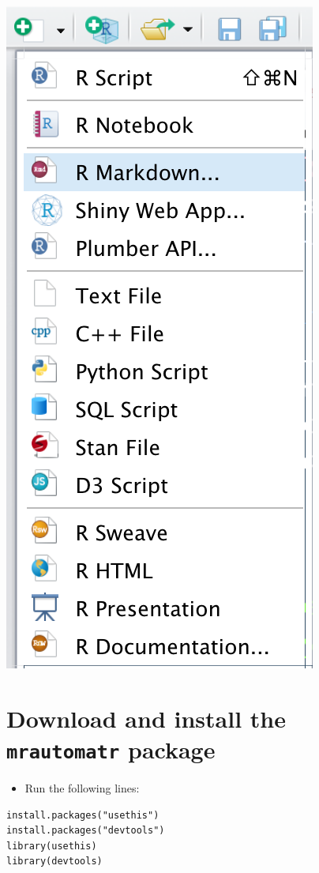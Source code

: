 \documentclass[
]{book}
\providecommand{\tightlist}{%
  \setlength{\itemsep}{0pt}\setlength{\parskip}{0pt}}
\begin{document}
\begin{center}\includegraphics[width=0.66\linewidth]{images/Rstudio_toolbar} \end{center}

\hypertarget{download-and-install-the-mrautomatr-package}{%
\section{\texorpdfstring{Download and install the \texttt{mrautomatr} package}{Download and install the mrautomatr package}}\label{download-and-install-the-mrautomatr-package}}

\begin{itemize}
\tightlist
\item
  Run the following lines:
\end{itemize}

\begin{verbatim}
install.packages("usethis")
install.packages("devtools")
library(usethis)
library(devtools)
\end{verbatim}
\end{document}
